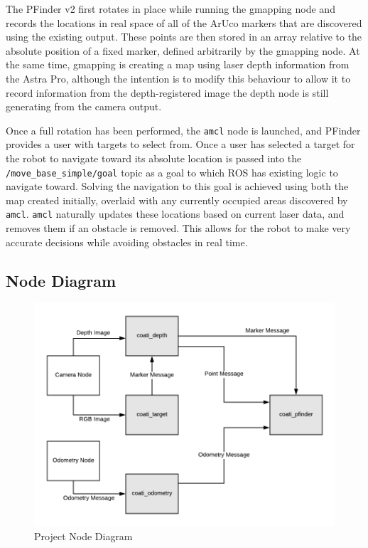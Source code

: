 \documentclass{article}[12]
\begin{document}
	The PFinder v2 first rotates in place while running the gmapping node and records the locations in real space of all of the ArUco markers that are discovered using the existing output. These points are then stored in an array relative to the absolute position of a fixed marker, defined arbitrarily by the gmapping node. At the same time, gmapping is creating a map using laser depth information from the Astra Pro, although the intention is to modify this behaviour to allow it to record information from the depth-registered image the depth node is still generating from the camera output.
	
	Once a full rotation has been performed, the \texttt{amcl} node is launched, and PFinder provides a user with targets to select from. Once a user has selected a target for the robot to navigate toward its absolute location is passed into the \texttt{/move\_base\_simple/goal} topic as a goal to which ROS has existing logic to navigate toward. Solving the navigation to this goal is achieved using both the map created initially, overlaid with any currently occupied areas discovered by \texttt{amcl}. \texttt{amcl} naturally updates these locations based on current laser data, and removes them if an obstacle is removed. This allows for the robot to make very accurate decisions while avoiding obstacles in real time. 
	
	\subsection{Node Diagram}

	\begin{figure}[H]
		\centering
		\includegraphics[width=0.8\linewidth]{NodeDiagram}
		\caption{Project Node Diagram}
		\label{fig:nodediagram}
	\end{figure}
\end{document}

